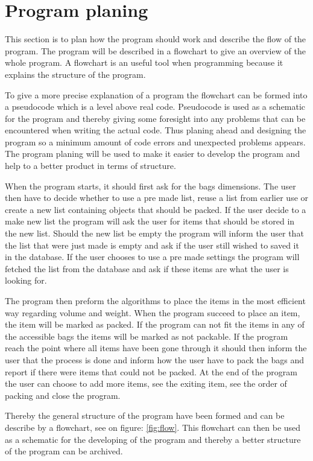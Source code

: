 \section{Program planing}
This section is to plan how the program should work and describe the flow of the program. The program will be described in a flowchart to give an overview of the whole program. A flowchart is an useful tool when programming because it explains the structure of the program.

To give a more precise explanation of a program the flowchart can be formed into a pseudocode which is a level above real code. Pseudocode is used as a schematic for the program and thereby giving some foresight into any problems that can be encountered when writing the actual code. Thus planing ahead and designing the program so a minimum amount of code errors and unexpected problems appears.
The program planing will be used to make it easier to develop the program and help to a better product in terms of structure.

When the program starts, it should first ask for the bags dimensions. The user then have to decide whether to use a pre made list, reuse a list from earlier use or create a new list containing objects that should be packed. If the user decide to a make new list the program will ask the user for items that should be stored in the new list. Should the new list be empty the program will inform the user that the list that were just made is empty and ask if the user still wished to saved it in the database.
If the user chooses to use a pre made settings the program will fetched the list from the database and ask if these items are what the user is looking for.

The program then preform the algorithms to place the items in the most efficient way regarding volume and weight. When the program succeed to place an item, the item will be marked as packed. If the program can not fit the items in any of the accessible bags the items will be marked as not packable. If the program reach the point where all items have been gone through it should then inform the user that the process is done and inform how the user have to pack the bags and report if there were items that could not be packed.
At the end of the program the user can choose to add more items, see the exiting item, see the order of packing and close the program.


Thereby the general structure of the program have been formed and can be describe by a flowchart, see on figure: \ref{fig:flow}.
This flowchart can then be used as a schematic for the developing of the program and thereby a better structure of the program can be archived.